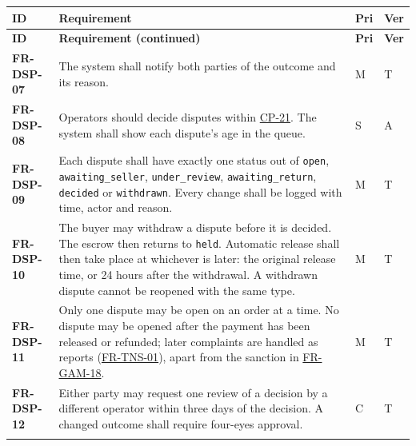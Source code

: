 \documentclass[11pt,a4paper]{report}
\makeatletter
\newenvironment{reqs}{%
  \small
  \begin{longtable}{@{}>{\raggedright\arraybackslash}p{2.35cm}
                       >{\raggedright\arraybackslash}p{10.3cm}
                       >{\centering\arraybackslash}p{0.7cm}
                       >{\centering\arraybackslash}p{0.7cm}@{}}
  \toprule
  \textbf{ID} & \textbf{Requirement} & \textbf{Pri} & \textbf{Ver} \\
  \midrule
  \endfirsthead
  \toprule
  \textbf{ID} & \textbf{Requirement (continued)} & \textbf{Pri} & \textbf{Ver} \\
  \midrule
  \endhead
  \bottomrule
  \endfoot
}{\end{longtable}}
\newcommand{\req}[5]{\leavevmode\textbf{#1}\hypertarget{#1}{} & #5 & #2 & #3 \\ \addlinespace[2pt]}
\newcommand{\rr}[1]{\hyperlink{#1}{#1}}
\newcommand{\cp}[1]{\hyperlink{#1}{#1}}
\makeatother
\begin{document}
\begin{reqs}
\req{FR-DSP-07}{M}{T}{FR-72}{The system shall notify both parties of the outcome and its reason.}
\req{FR-DSP-08}{S}{A}{new}{Operators should decide disputes within \cp{CP-21}. The system shall show each dispute's age in the queue.}
\req{FR-DSP-09}{M}{T}{FR-73}{Each dispute shall have exactly one status out of \texttt{open}, \texttt{awaiting\_seller}, \texttt{under\_review}, \texttt{awaiting\_return}, \texttt{decided} or \texttt{withdrawn}. Every change shall be logged with time, actor and reason.}
\req{FR-DSP-10}{M}{T}{new}{The buyer may withdraw a dispute before it is decided. The escrow then returns to \texttt{held}. Automatic release shall then take place at whichever is later: the original release time, or 24 hours after the withdrawal. A withdrawn dispute cannot be reopened with the same type.}
\req{FR-DSP-11}{M}{T}{new}{Only one dispute may be open on an order at a time. No dispute may be opened after the payment has been released or refunded; later complaints are handled as reports (\rr{FR-TNS-01}), apart from the sanction in \rr{FR-GAM-18}.}
\req{FR-DSP-12}{C}{T}{new}{Either party may request one review of a decision by a different operator within three days of the decision. A changed outcome shall require four-eyes approval.}
\end{reqs}
\end{document}
